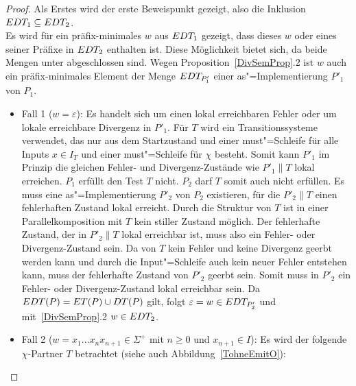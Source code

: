 \begin{proof}
  Als Erstes wird der erste Beweispunkt gezeigt, also die Inklusion $EDT
  _1\subseteq EDT _2$.\\
  Es wird für ein präfix-minimales $w$ aus $EDT _1$ gezeigt, dass dieses $w$
  oder eines seiner Präfixe in $EDT _2$ enthalten ist. Diese Möglichkeit
  bietet sich, da beide Mengen unter \cont{} abgeschlossen sind. Wegen
  Proposition~\ref{DivSemProp}.2 ist $w$ auch ein präfix-minimales Element der
  Menge $EDT _{P'_1}$ einer as"=Implementierung $P'_1$ von $P_1$.
  \begin{itemize}
    \item Fall 1 ($w=\varepsilon$): Es handelt sich um einen lokal erreichbaren
      Fehler oder um lokale erreichbare Divergenz in $P'_1$. Für $T$ wird ein
      Transitionssysteme verwendet, das nur aus dem Startzustand und einer
      must"=Schleife für alle Inputs $x\in I_T$ und einer must"=Schleife für
      $\chi$ besteht. Somit kann $P'_1$ im Prinzip die gleichen Fehler- und
      Divergenz-Zustände wie $P'_1\|T$ lokal erreichen. $P_1$ erfüllt den Test
      $T$ nicht. $P_2$ darf $T$ somit auch nicht erfüllen. Es muss eine
      as"=Implementierung $P'_2$ von $P_2$ existieren, für die $P'_2\|T$ einen
      fehlerhaften Zustand lokal erreicht. Durch die Struktur von $T$ ist in
      einer Parallelkomposition mit $T$ kein stiller Zustand möglich. Der
      fehlerhafte Zustand, der in $P'_2\|T$ lokal erreichbar ist, muss also ein
      Fehler- oder Divergenz-Zustand sein. Da von $T$ kein Fehler und keine
      Divergenz geerbt werden kann und durch die Input"=Schleife auch kein
      neuer Fehler entstehen kann, muss der fehlerhafte Zustand von $P'_2$
      geerbt sein. Somit muss in $P'_2$ ein Fehler- oder Divergenz-Zustand
      lokal erreichbar sein. Da $EDT (P) =ET (P)\cup DT (P)$ gilt, folgt
      $\varepsilon = w\in EDT _{P'_2}$ und mit~\ref{DivSemProp}.2 $w\in EDT
      _2$.
    \item Fall 2 ($w=x_1\dots x_n x_{n+1}\in\Sigma ^+$ mit $n\geq 0$ und
      $x_{n+1}\in I$): Es wird der folgende $\chi$-Partner $T$ betrachtet
      (siehe auch Abbildung~\ref{TohneEmitO}):
\end{itemize}
\end{proof}

